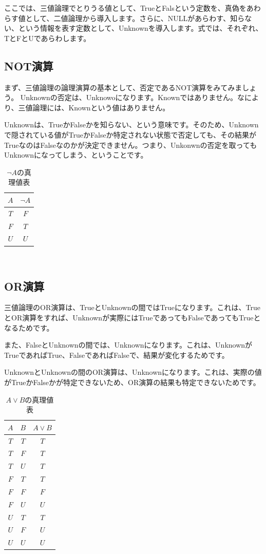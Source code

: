 ここでは、三値論理でとりうる値として、TrueとFalsという定数を、真偽をあわらす値として、二値論理から導入します。さらに、NULLがあらわす、知らない、という情報を表す定数として、Unknownを導入します。式では、それぞれ、TとFとUであらわします。

\subsection{NOT演算}

まず、三値論理の論理演算の基本として、否定であるNOT演算をみてみましょう。
Unknownの否定は、Unknowoになります。Knownではありません。なにより、三値論理には、Knownという値はありません。

Unknownは、TrueかFalseかを知らない、という意味です。そのため、Unknownで隠されている値がTrueかFalseか特定されない状態で否定しても、その結果がTrueなのはFalseなのかが決定できません。つまり、Unkonwnの否定を取ってもUnknownになってしまう、ということです。

\begin{table}[htb]
  \begin{tabular}{|c|c|} \hline
    $A$ & $\lnot A$ \\ \hline
    $T$ & $F$ \\
    $F$ & $T$ \\
    $U$ & $U$ \\ \hline
  \end{tabular}
　　\label{chart:not}
　　\caption{$\lnot A$の真理値表}
\end{table}



\subsection{OR演算}

三値論理のOR演算は、TrueとUnknownの間ではTrueになります。これは、TrueとOR演算をすれば、Unknownが実際にはTrueであってもFalseであってもTrueとなるためです。

また、FalseとUnknownの間では、Unknownになります。これは、UnknownがTrueであればTrue、FalseであればFalseで、結果が変化するためです。

UnknownとUnknownの間のOR演算は、Unknownになります。これは、実際の値がTrueかFalseかが特定できないため、OR演算の結果も特定できないためです。

\begin{table}[htb]
  \begin{tabular}{|c|c|c|} \hline
    $A$ & $B$ & $A \lor B$ \\ \hline
    $T$ & $T$ & $T$ \\
    $T$ & $F$ & $T$ \\
    $T$ & $U$ & $T$ \\
    $F$ & $T$ & $T$ \\
    $F$ & $F$ & $F$ \\
    $F$ & $U$ & $U$ \\
    $U$ & $T$ & $T$ \\
    $U$ & $F$ & $U$ \\
    $U$ & $U$ & $U$\\ \hline
  \end{tabular}
　　\label{chart:or}
　　\caption{$A \lor B$の真理値表}
\end{table}


